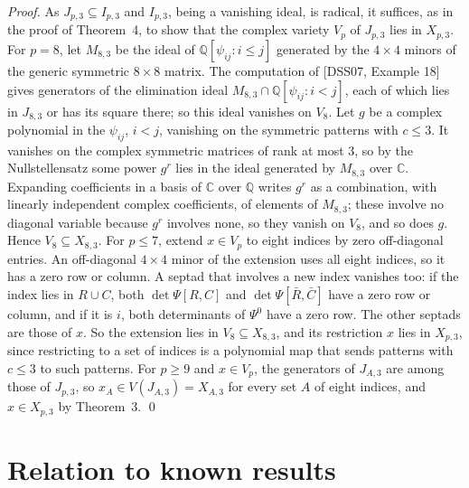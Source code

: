 \documentclass[11pt,letterpaper,reqno]{amsart}
\theoremstyle{spaced}
\begin{document}
\emph{Proof.} As \(J_{p,3} \subseteq I_{p,3}\) and \(I_{p,3}\), being a vanishing ideal, is radical, it suffices, as in the proof of Theorem~4, to show that the complex variety \(V_p\) of \(J_{p,3}\) lies in \(X_{p,3}\). For \(p = 8\), let \(M_{8,3}\) be the ideal of \(\mathbb{Q}[\psi_{ij} : i \le j]\) generated by the \(4 \times 4\) minors of the generic symmetric \(8 \times 8\) matrix. The computation of {[}DSS07, Example 18{]} gives generators of the elimination ideal \(M_{8,3} \cap \mathbb{Q}[\psi_{ij} : i < j]\), each of which lies in \(J_{8,3}\) or has its square there; so this ideal vanishes on \(V_8\). Let \(g\) be a complex polynomial in the \(\psi_{ij}\), \(i < j\), vanishing on the symmetric patterns with \(c \le 3\). It vanishes on the complex symmetric matrices of rank at most 3, so by the Nullstellensatz some power \(g^r\) lies in the ideal generated by \(M_{8,3}\) over \(\mathbb{C}\). Expanding coefficients in a basis of \(\mathbb{C}\) over \(\mathbb{Q}\) writes \(g^r\) as a combination, with linearly independent complex coefficients, of elements of \(M_{8,3}\); these involve no diagonal variable because \(g^r\) involves none, so they vanish on \(V_8\), and so does \(g\). Hence \(V_8 \subseteq X_{8,3}\). For \(p \le 7\), extend \(x \in V_p\) to eight indices by zero off-diagonal entries. An off-diagonal \(4 \times 4\) minor of the extension uses all eight indices, so it has a zero row or column. A septad that involves a new index vanishes too: if the index lies in \(R \cup C\), both \(\det \Psi[R, C]\) and \(\det \Psi[\bar R, \bar C]\) have a zero row or column, and if it is \(i\), both determinants of \(\Psi^0\) have a zero row. The other septads are those of \(x\). So the extension lies in \(V_8 \subseteq X_{8,3}\), and its restriction \(x\) lies in \(X_{p,3}\), since restricting to a set of indices is a polynomial map that sends patterns with \(c \le 3\) to such patterns. For \(p \ge 9\) and \(x \in V_p\), the generators of \(J_{A,3}\) are among those of \(J_{p,3}\), so \(x_A \in V(J_{A,3}) = X_{A,3}\) for every set \(A\) of eight indices, and \(x \in X_{p,3}\) by Theorem~3. \qed

\hypertarget{relation-to-known-results}{%
\section{Relation to known results}\label{relation-to-known-results}}
\end{document}
